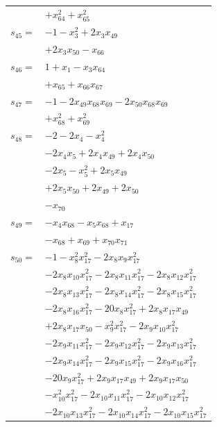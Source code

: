 \begin{longtable}{@{}r@{\;}l@{}}
 & \(\displaystyle +x_{64}^{2} +x_{65}^{2}\) \\[3pt]
\(s_{45}=\) & \(\displaystyle -1 -x_{3}^{2} +2x_{3}x_{49}\) \\
 & \(\displaystyle +2x_{3}x_{50} -x_{66}\) \\[3pt]
\(s_{46}=\) & \(\displaystyle 1 +x_{1} -x_{3}x_{64}\) \\
 & \(\displaystyle +x_{65} +x_{66}x_{67}\) \\[3pt]
\(s_{47}=\) & \(\displaystyle -1 -2x_{49}x_{68}x_{69} -2x_{50}x_{68}x_{69}\) \\
 & \(\displaystyle +x_{68}^{2} +x_{69}^{2}\) \\[3pt]
\(s_{48}=\) & \(\displaystyle -2 -2x_{4} -x_{4}^{2}\) \\
 & \(\displaystyle -2x_{4}x_{5} +2x_{4}x_{49} +2x_{4}x_{50}\) \\
 & \(\displaystyle -2x_{5} -x_{5}^{2} +2x_{5}x_{49}\) \\
 & \(\displaystyle +2x_{5}x_{50} +2x_{49} +2x_{50}\) \\
 & \(\displaystyle -x_{70}\) \\[3pt]
\(s_{49}=\) & \(\displaystyle -x_{4}x_{68} -x_{5}x_{68} +x_{17}\) \\
 & \(\displaystyle -x_{68} +x_{69} +x_{70}x_{71}\) \\[3pt]
\(s_{50}=\) & \(\displaystyle -1 -x_{8}^{2}x_{17}^{2} -2x_{8}x_{9}x_{17}^{2}\) \\
 & \(\displaystyle -2x_{8}x_{10}x_{17}^{2} -2x_{8}x_{11}x_{17}^{2} -2x_{8}x_{12}x_{17}^{2}\) \\
 & \(\displaystyle -2x_{8}x_{13}x_{17}^{2} -2x_{8}x_{14}x_{17}^{2} -2x_{8}x_{15}x_{17}^{2}\) \\
 & \(\displaystyle -2x_{8}x_{16}x_{17}^{2} -20x_{8}x_{17}^{2} +2x_{8}x_{17}x_{49}\) \\
 & \(\displaystyle +2x_{8}x_{17}x_{50} -x_{9}^{2}x_{17}^{2} -2x_{9}x_{10}x_{17}^{2}\) \\
 & \(\displaystyle -2x_{9}x_{11}x_{17}^{2} -2x_{9}x_{12}x_{17}^{2} -2x_{9}x_{13}x_{17}^{2}\) \\
 & \(\displaystyle -2x_{9}x_{14}x_{17}^{2} -2x_{9}x_{15}x_{17}^{2} -2x_{9}x_{16}x_{17}^{2}\) \\
 & \(\displaystyle -20x_{9}x_{17}^{2} +2x_{9}x_{17}x_{49} +2x_{9}x_{17}x_{50}\) \\
 & \(\displaystyle -x_{10}^{2}x_{17}^{2} -2x_{10}x_{11}x_{17}^{2} -2x_{10}x_{12}x_{17}^{2}\) \\
 & \(\displaystyle -2x_{10}x_{13}x_{17}^{2} -2x_{10}x_{14}x_{17}^{2} -2x_{10}x_{15}x_{17}^{2}\) \\

\end{longtable}
